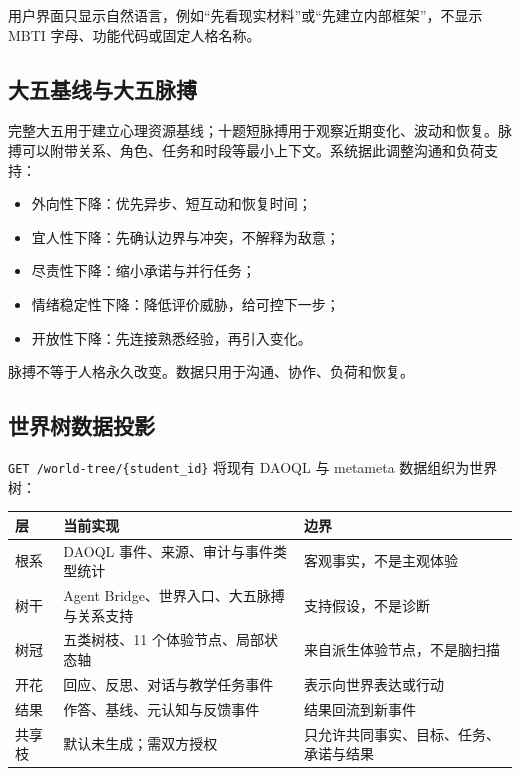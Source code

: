 \documentclass[UTF8,a4paper,11pt]{ctexart}
\begin{document}
用户界面只显示自然语言，例如“先看现实材料”或“先建立内部框架”，不显示 MBTI 字母、功能代码或固定人格名称。

\subsection{大五基线与大五脉搏}

完整大五用于建立心理资源基线；十题短脉搏用于观察近期变化、波动和恢复。脉搏可以附带关系、角色、任务和时段等最小上下文。系统据此调整沟通和负荷支持：

\begin{itemize}
\item 外向性下降：优先异步、短互动和恢复时间；
\item 宜人性下降：先确认边界与冲突，不解释为敌意；
\item 尽责性下降：缩小承诺与并行任务；
\item 情绪稳定性下降：降低评价威胁，给可控下一步；
\item 开放性下降：先连接熟悉经验，再引入变化。
\end{itemize}

脉搏不等于人格永久改变。数据只用于沟通、协作、负荷和恢复。

\subsection{世界树数据投影}

\texttt{GET /world-tree/\{student\_id\}} 将现有 DAOQL 与 metameta 数据组织为世界树：

\begin{center}
\begin{longtable}{@{}p{3.2cm}p{5.0cm}p{5.0cm}@{}}
\toprule
\textbf{层} & \textbf{当前实现} & \textbf{边界} \\
\midrule
根系 & DAOQL 事件、来源、审计与事件类型统计 & 客观事实，不是主观体验 \\
树干 & Agent Bridge、世界入口、大五脉搏与关系支持 & 支持假设，不是诊断 \\
树冠 & 五类树枝、11 个体验节点、局部状态轴 & 来自派生体验节点，不是脑扫描 \\
开花 & 回应、反思、对话与教学任务事件 & 表示向世界表达或行动 \\
结果 & 作答、基线、元认知与反馈事件 & 结果回流到新事件 \\
共享枝 & 默认未生成；需双方授权 & 只允许共同事实、目标、任务、承诺与结果 \\
\bottomrule
\end{longtable}
\end{center}
\end{document}
